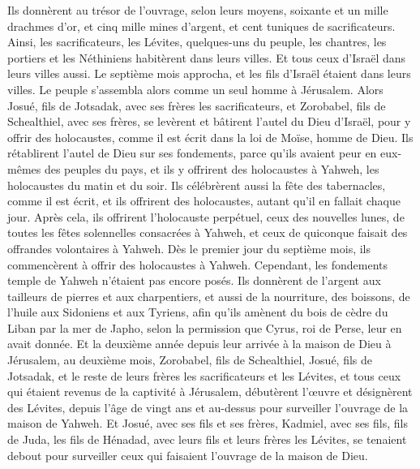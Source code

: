 \begin{multicols}{2}
Ils donnèrent au trésor de l'ouvrage, selon leurs moyens, soixante et un mille drachmes d'or, et cinq mille mines d'argent, et cent tuniques de sacrificateurs.
Ainsi, les sacrificateurs, les Lévites, quelques-uns du peuple, les chantres, les portiers et les Néthiniens habitèrent dans leurs villes. Et tous ceux d'Israël dans leurs villes aussi.
\VerseOne{}Le septième mois approcha, et les fils d'Israël étaient dans leurs villes. Le peuple s'assembla alors comme un seul homme à Jérusalem.
Alors Josué, fils de Jotsadak, avec ses frères les sacrificateurs, et Zorobabel, fils de Schealthiel, avec ses frères, se levèrent et bâtirent l'autel du Dieu d'Israël, pour y offrir des holocaustes, comme il est écrit dans la loi de Moïse, homme de Dieu.
Ils rétablirent l'autel de Dieu sur ses fondements, parce qu'ils avaient peur en eux-mêmes des peuples du pays, et ils y offrirent des holocaustes à Yahweh, les holocaustes du matin et du soir.
Ils célébrèrent aussi la fête des tabernacles, comme il est écrit, et ils offrirent des holocaustes, autant qu'il en fallait  chaque jour.
Après cela, ils offrirent l'holocauste perpétuel, ceux des nouvelles lunes, de toutes les fêtes solennelles consacrées à Yahweh, et ceux de quiconque faisait des offrandes volontaires à Yahweh.
Dès le premier jour du septième mois, ils commencèrent à offrir des holocaustes à Yahweh. Cependant, les fondements temple de Yahweh n'étaient pas encore posés.
Ils donnèrent de l'argent aux tailleurs de pierres et aux charpentiers, et aussi de la nourriture, des boissons, de l'huile aux Sidoniens et aux Tyriens, afin qu'ils amènent du bois de cèdre du Liban par la mer de Japho, selon la permission que Cyrus, roi de Perse, leur en avait donnée.
Et la deuxième année depuis leur arrivée à la maison de Dieu à Jérusalem, au deuxième mois, Zorobabel, fils de Schealthiel,  Josué, fils de Jotsadak, et le reste de leurs frères les sacrificateurs et les Lévites, et tous ceux qui étaient revenus de la captivité à Jérusalem, débutèrent l’œuvre et désignèrent des Lévites, depuis l'âge de vingt ans et au-dessus pour surveiller l'ouvrage de la maison de Yahweh.
Et Josué, avec ses fils et ses frères, Kadmiel, avec ses fils, fils de Juda, les fils de Hénadad, avec leurs fils et leurs frères les Lévites, se tenaient debout pour surveiller ceux qui faisaient l'ouvrage de la maison de Dieu.

\end{multicols}
